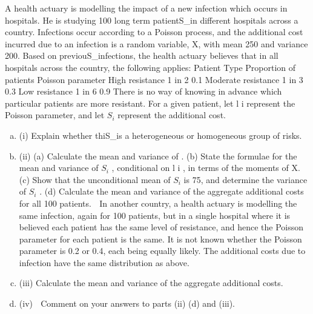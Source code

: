 \documentclass[a4paper,12pt]{article}
\begin{document}
A health actuary is modelling the impact of a new infection which occurs in hospitals.
He is studying 100 long term patientS_{i}n different hospitals across a country.
Infections occur according to a Poisson process, and the additional cost incurred due
to an infection is a random variable, X, with mean 250 and variance 200.
Based on previouS_{i}nfections, the health actuary believes that in all hospitals across the country, the following applies:
Patient Type
Proportion of patients Poisson parameter
High resistance 1 in 2 0.1
Moderate resistance 1 in 3 0.3
Low resistance 1 in 6 0.9
There is no way of knowing in advance which particular patients are more resistant.
For a given patient, let l i represent the Poisson parameter, and let $S_i$ represent the additional cost.
\begin{enumerate}[(a)]
\item (i) Explain whether thiS_{i}s a heterogeneous or homogeneous group of risks.


\item  (ii) (a) Calculate the mean and variance of \lambda  .
(b) State the formulae for the mean and variance of $S_i$ , conditional on l i , in terms of the moments of X.
(c) Show that the unconditional mean of $S_i$ is 75, and determine the
variance of $S_{i}$ .
(d)
Calculate the mean and variance of the aggregate additional costs for
all 100 patients.

In another country, a health actuary is modelling the same infection, again for 100 patients, but in a single hospital where it is believed each patient has the same level
of resistance, and hence the Poisson parameter for each patient is the same. It is not known whether the Poisson parameter is 0.2 or 0.4, each being equally likely. The
additional costs due to infection have the same distribution as above.
\item (iii) Calculate the mean and variance of the aggregate additional costs.
\item (iv)
 Comment on your answers to parts (ii) (d) and (iii).
\end{enumerate}
\end{document}
